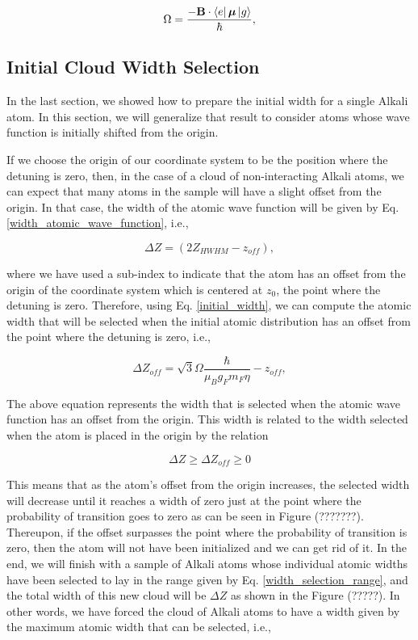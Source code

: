\documentclass{article}
\begin{document}
\begin{equation}
\Omega = \frac{- \textbf{B} \cdot \bra{e} \boldsymbol{\mu} \ket{g}}{\hbar},
\end{equation}

\subsection{Initial Cloud Width Selection}
In the last section, we showed how to prepare the initial width for a single Alkali atom. In this section, we will generalize that result to consider atoms whose wave function is initially shifted from the origin.

If we choose the origin of our coordinate system to be the position where the detuning is zero, then, in the case of a cloud of non-interacting Alkali atoms, we can expect that many atoms in the sample will have a slight offset from the origin. In that case, the width of the atomic wave function will be given by Eq. \ref{width_atomic_wave_function}, i.e.,

\begin{equation}
  \Delta Z = (2Z_{HWHM} - z_{off}),
\end{equation}

where we have used a sub-index to indicate that the atom has an offset from the origin of the coordinate system which is centered at $z_{0}$, the point where the detuning is zero. Therefore, using Eq. \ref{initial_width}, we can compute the atomic width that will be selected when the initial atomic distribution has an offset from the point where the detuning is zero, i.e.,

\begin{equation}
\Delta Z_{off} = \sqrt{3} \Omega \frac{\hbar}{\mu_{B} g_{F} m_{F} \eta} - z_{off},
\end{equation}

The above equation represents the width that is selected when the atomic wave function has an offset from the origin. This width is related to the width selected when the atom is placed in the origin by the relation

\begin{equation}\label{width_selection_range}
    \Delta Z \ge \Delta Z_{off}  \ge 0
\end{equation}

This means that as the atom's offset from the origin increases, the selected width will decrease until it reaches a width of zero just at the point where the probability of transition goes to zero as can be seen in Figure (???????). Thereupon, if the offset surpasses the point where the probability of transition is zero, then the atom will not have been initialized and we can get rid of it. In the end, we will finish with a sample of Alkali atoms whose individual atomic widths have been selected to lay in the range given by Eq. \ref{width_selection_range}, and the total width of this new cloud will be $\Delta Z$ as shown in the Figure (?????). In other words, we have forced the cloud of Alkali atoms to have a width given by the maximum atomic width that can be selected, i.e.,
\end{document}
